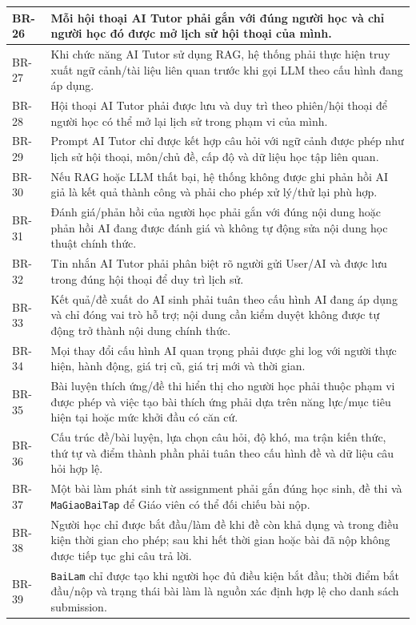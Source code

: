 \documentclass[12pt,a4paper,oneside]{report}
\begin{document}
\begin{longtable}{|p{1.6cm}|p{12.7cm}|}
BR-26 & Mỗi hội thoại AI Tutor phải gắn với đúng người học và chỉ người học đó được mở lịch sử hội thoại của mình. \\ \hline
BR-27 & Khi chức năng AI Tutor sử dụng RAG, hệ thống phải thực hiện truy xuất ngữ cảnh/tài liệu liên quan trước khi gọi LLM theo cấu hình đang áp dụng. \\ \hline
BR-28 & Hội thoại AI Tutor phải được lưu và duy trì theo phiên/hội thoại để người học có thể mở lại lịch sử trong phạm vi của mình. \\ \hline
BR-29 & Prompt AI Tutor chỉ được kết hợp câu hỏi với ngữ cảnh được phép như lịch sử hội thoại, môn/chủ đề, cấp độ và dữ liệu học tập liên quan. \\ \hline
BR-30 & Nếu RAG hoặc LLM thất bại, hệ thống không được ghi phản hồi AI giả là kết quả thành công và phải cho phép xử lý/thử lại phù hợp. \\ \hline
BR-31 & Đánh giá/phản hồi của người học phải gắn với đúng nội dung hoặc phản hồi AI đang được đánh giá và không tự động sửa nội dung học thuật chính thức. \\ \hline
BR-32 & Tin nhắn AI Tutor phải phân biệt rõ người gửi User/AI và được lưu trong đúng hội thoại để duy trì lịch sử. \\ \hline
BR-33 & Kết quả/đề xuất do AI sinh phải tuân theo cấu hình AI đang áp dụng và chỉ đóng vai trò hỗ trợ; nội dung cần kiểm duyệt không được tự động trở thành nội dung chính thức. \\ \hline
BR-34 & Mọi thay đổi cấu hình AI quan trọng phải được ghi log với người thực hiện, hành động, giá trị cũ, giá trị mới và thời gian. \\ \hline
BR-35 & Bài luyện thích ứng/đề thi hiển thị cho người học phải thuộc phạm vi được phép và việc tạo bài thích ứng phải dựa trên năng lực/mục tiêu hiện tại hoặc mức khởi đầu có căn cứ. \\ \hline
BR-36 & Cấu trúc đề/bài luyện, lựa chọn câu hỏi, độ khó, ma trận kiến thức, thứ tự và điểm thành phần phải tuân theo cấu hình đề và dữ liệu câu hỏi hợp lệ. \\ \hline
BR-37 & Một bài làm phát sinh từ assignment phải gắn đúng học sinh, đề thi và \texttt{MaGiaoBaiTap} để Giáo viên có thể đối chiếu bài nộp. \\ \hline
BR-38 & Người học chỉ được bắt đầu/làm đề khi đề còn khả dụng và trong điều kiện thời gian cho phép; sau khi hết thời gian hoặc bài đã nộp không được tiếp tục ghi câu trả lời. \\ \hline
BR-39 & \texttt{BaiLam} chỉ được tạo khi người học đủ điều kiện bắt đầu; thời điểm bắt đầu/nộp và trạng thái bài làm là nguồn xác định hợp lệ cho danh sách submission. \\ \hline

\end{longtable}
\end{document}
